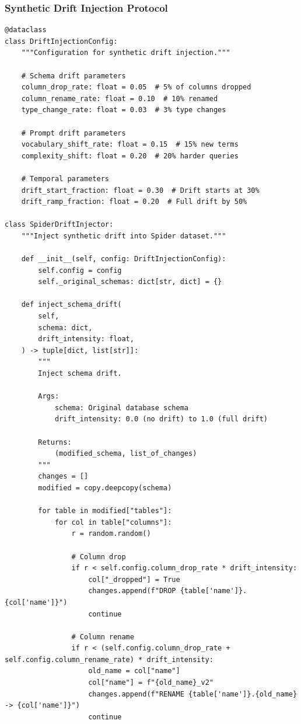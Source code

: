 \subsubsection{Synthetic Drift Injection Protocol}

\begin{lstlisting}[language=jsonx,caption={Drift injection for validation}]
@dataclass
class DriftInjectionConfig:
    """Configuration for synthetic drift injection."""
    
    # Schema drift parameters
    column_drop_rate: float = 0.05  # 5% of columns dropped
    column_rename_rate: float = 0.10  # 10% renamed
    type_change_rate: float = 0.03  # 3% type changes
    
    # Prompt drift parameters
    vocabulary_shift_rate: float = 0.15  # 15% new terms
    complexity_shift: float = 0.20  # 20% harder queries
    
    # Temporal parameters
    drift_start_fraction: float = 0.30  # Drift starts at 30%
    drift_ramp_fraction: float = 0.20  # Full drift by 50%

class SpiderDriftInjector:
    """Inject synthetic drift into Spider dataset."""
    
    def __init__(self, config: DriftInjectionConfig):
        self.config = config
        self._original_schemas: dict[str, dict] = {}
    
    def inject_schema_drift(
        self,
        schema: dict,
        drift_intensity: float,
    ) -> tuple[dict, list[str]]:
        """
        Inject schema drift.
        
        Args:
            schema: Original database schema
            drift_intensity: 0.0 (no drift) to 1.0 (full drift)
            
        Returns:
            (modified_schema, list_of_changes)
        """
        changes = []
        modified = copy.deepcopy(schema)
        
        for table in modified["tables"]:
            for col in table["columns"]:
                r = random.random()
                
                # Column drop
                if r < self.config.column_drop_rate * drift_intensity:
                    col["_dropped"] = True
                    changes.append(f"DROP {table['name']}.{col['name']}")
                    continue
                
                # Column rename
                if r < (self.config.column_drop_rate + self.config.column_rename_rate) * drift_intensity:
                    old_name = col["name"]
                    col["name"] = f"{old_name}_v2"
                    changes.append(f"RENAME {table['name']}.{old_name} -> {col['name']}")
                    continue
                

\end{lstlisting}

